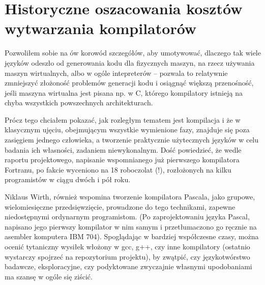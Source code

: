 \section{Historyczne oszacowania kosztów wytwarzania kompilatorów}
Pozwoliłem sobie na ów korowód szczegółów, aby umotywować, dlaczego tak wiele języków odeszło od generowania kodu dla fizycznych maszyn, na rzecz używania maszyn wirtualnych, albo w ogóle intepreterów – pozwala to relatywnie zmniejszyć złożoność problemów generacji kodu i osiągnąć większą przenośność, jeśli maszyna wirtualna jest pisana np. w C, którego kompilatory istnieją na chyba wszystkich powszechnych architekturach.

Prócz tego chciałem pokazać, jak rozległym tematem jest kompilacja i że w klasycznym ujęciu, obejmującym wszystkie wymienione fazy, znajduje się poza zasięgiem jednego człowieka, a tworzenie praktycznie użytecznych języków w celu badania ich własności, zadaniem niewykonalnym. Dość powiedzieć, że wedle raportu projektowego, napisanie wspomnianego już pierwszego kompilatora Fortranu, po fakcie wyceniono na 18 roboczolat (!), rozłożonych na kilku programistów w ciągu dwóch i pół roku\cite{FORTRAN_AUTOMATIC_CODING_SYSTEM}.

Niklaus Wirth, również wspomina tworzenie kompilatora Pascala, jako grupowe, wielomiesięczne przedsięwzięcie, prowadzone do tego technikami, zapewne niedostępnymi ordynarnym programistom. (Po zaprojektowaniu języka Pascal, napisano jego pierwszy kompilator w nim samym i przetłumaczono go ręcznie na asembler komputera IBM 704)\cite{Wirth_recollections_Pascal}. Spoglądając w bardziej współczesne czasy, można ocenić tytaniczny wysiłek włożony w gcc, g++, czy inne kompilatory (ostatnio wystarczy spojrzeć na repozytorium projektu), by zwątpić, czy językotwórstwo badawcze, eksploracyjne, czy podyktowane zwyczajnie własnymi upodobaniami ma szansę w ogóle się ziścić.


